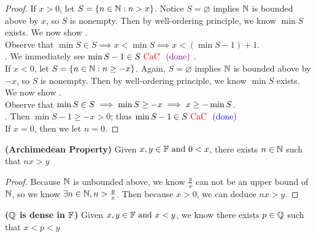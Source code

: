 \documentclass{report}
\begin{document}
\begin{proof}
If $x>0$, let $S=\{ n\in\mathbb{N}: n>x \}$. Notice $S=\varnothing$ implies $\mathbb{N}$ is bounded above by $x$, so $S$ is nonempty. Then by well-ordering principle, we know $\min S$ exists. We now show .\\

Observe that $\min S\in S\implies x<\min S\implies x<(\min S-1)+1$.\\

. We immediately see $\min S-1\in S\text{ \textcolor{red}{CaC} }\textcolor{violet}{\text{ (done) }}$.\\

If $x<0$, let $S=\{ n\in\mathbb{N}:n\geq -x \}$. Again, $S=\varnothing$ implies $\mathbb{N}$ is bounded above by $-x$, so $S$ is nonempty. Then by well-ordering principle, we know $\min S$ exists. We now show .\\

Observe that $\min S\in S\implies \min S\geq -x\implies x\geq -\min S$.\\

. Then $\min S-1\geq -x>0$; thus $\min S-1\in S\text{ \textcolor{red}{CaC} }\textcolor{blue}{\text{ (done) }}$\\

If $x=0$, then we let $n=0$. 
\end{proof}
\begin{theorem}
\textbf{(Archimedean Property)} Given $x,y\in\mathbb{F}\text{ and }0<x$, there exists $n\in\mathbb{N}$ such that $nx>y$ 
\end{theorem}
\begin{proof}
 Because $\mathbb{N}$ is unbounded above, we know  $\frac{y}{x}$ can not be an upper bound of $\mathbb{N}$, so we know  $\exists n\in\mathbb{N},n>\frac{y}{x} $. Then because $x>0$, we can deduce $nx>y$.
\end{proof}
\begin{theorem}
\textbf{($\mathbb{Q}$ is dense in $\mathbb{F}$)} Given $x,y\in\mathbb{F}\text{ and }x<y$, we know there exists $p \in\mathbb{Q}$ such that $x<p<y$
\end{theorem}
\end{document}
